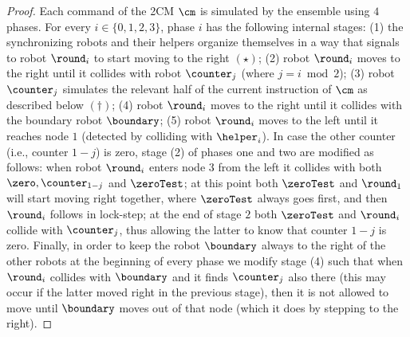 \begin{proof}
Each command of the 2CM $\cm$ is simulated by the ensemble using $4$ phases.
For every $i \in \{0,1,2,3\}$, phase $i$ has the following internal stages: (1) the synchronizing robots and their helpers organize themselves in a way that signals to robot $\round_i$ to start moving to the right $(\star)$; (2) robot $\round_i$ moves to the right until it collides with robot $\counter_j$ (where $j = i \bmod 2$); (3) robot $\counter_j$ simulates the relevant half of the current instruction of $\cm$ as described below $(\dagger)$; (4) robot $\round_i$ moves to the right until it collides with the boundary robot $\boundary$; (5) robot $\round_i$ moves to the left until it reaches node $1$ (detected by colliding with $\helper_i$). In case the other counter (i.e., counter $1-j$) is zero, stage (2) of phases one and two are modified as follows: when robot $\round_i$ enters node $3$ from the left it collides with both $\zero, \counter_{1-j}$ and $\zeroTest$; at this point both $\zeroTest$ and $\round_1$ will start moving right together, where $\zeroTest$ always goes first, and then $\round_i$ follows in lock-step; at the end of stage $2$ both $\zeroTest$ and $\round_i$ collide with $\counter_j$, thus allowing the latter to know that counter $1-j$ is zero. Finally, in order to keep the robot $\boundary$ always to the right of the other robots at the beginning of every phase we modify stage (4) such that when $\round_i$ collides with $\boundary$ and it finds $\counter_j$ also there (this may occur if the latter moved right in the previous stage), then it is not allowed to move until $\boundary$ moves out of that node (which it does by stepping to the right).



\end{proof}
